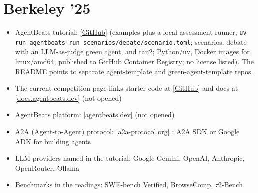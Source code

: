 \documentclass[10pt,oneside]{report}
\begin{document}
\section{Berkeley '25}
{\small\begin{itemize}
\item AgentBeats tutorial: \href{https://github.com/RDI-Foundation/agentbeats-tutorial}{[GitHub]} (examples plus a local assessment runner, \texttt{uv run agentbeats-run scenarios/\allowbreak{}debate/\allowbreak{}scenario.\allowbreak{}toml}; scenarios: debate with an LLM-as-judge green agent, and tau2; Python/uv, Docker images for linux/amd64, published to GitHub Container Registry; no license listed). The README points to separate agent-template and green-agent-template repos.
\item The current competition page links starter code at \href{https://github.com/agentbeats/tutorial}{[GitHub]} and docs at \href{https://docs.agentbeats.dev/tutorial/}{[docs.agentbeats.dev]} (not opened)
\item AgentBeats platform: \href{https://agentbeats.dev}{[agentbeats.dev]} (not opened)
\item A2A (Agent-to-Agent) protocol: \href{https://a2a-protocol.org}{[a2a-protocol.org]} ; A2A SDK or Google ADK for building agents
\item LLM providers named in the tutorial: Google Gemini, OpenAI, Anthropic, OpenRouter, Ollama
\item Benchmarks in the readings: SWE-bench Verified, BrowseComp, $\tau$2-Bench
\end{itemize}}
\end{document}
